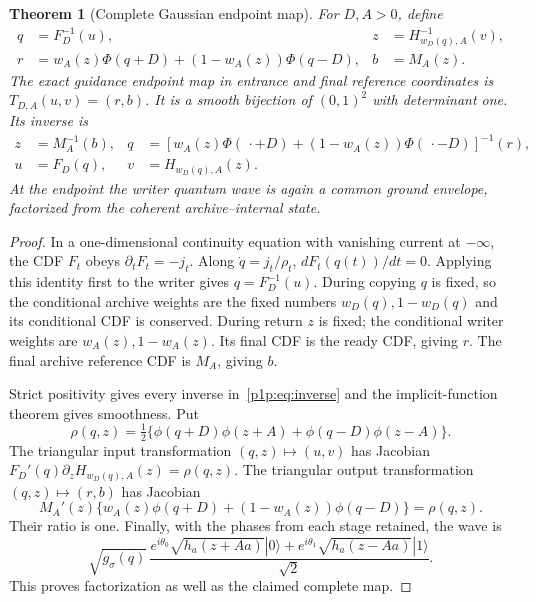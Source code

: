 \documentclass[11pt]{article}
\numberwithin{equation}{section}
\newtheorem{theorem}{Theorem}[section]
\theoremstyle{definition}
\theoremstyle{remark}
\begin{document}
\begin{theorem}[Complete Gaussian endpoint map]\label{p1p:thm:map}
For $D,A>0$, define
\begin{align}
 q&=F_D^{-1}(u),& z&=H_{w_D(q),A}^{-1}(v),\label{p1p:eq:map}\\
 r&=w_A(z)\Phi(q+D)+(1-w_A(z))\Phi(q-D),& b&=M_A(z).\nonumber
\end{align}
The exact guidance endpoint map in entrance and final reference
coordinates is $T_{D,A}(u,v)=(r,b)$. It is a smooth bijection of $(0,1)^2$
with determinant one. Its inverse is
\begin{align}
 z&=M_A^{-1}(b),&
 q&=[w_A(z)\Phi(\,\cdot+D)+(1-w_A(z))\Phi(\,\cdot-D)]^{-1}(r),
 \label{p1p:eq:inverse}\\
 u&=F_D(q),&v&=H_{w_D(q),A}(z).\nonumber
\end{align}
At the endpoint the writer quantum wave is again a common ground
envelope, factorized from the coherent archive--internal state.
\end{theorem}
\begin{proof}
In a one-dimensional continuity equation with vanishing current at
$-\infty$, the CDF $F_t$ obeys
$\partial_tF_t=-j_t$. Along $\dot q=j_t/\rho_t$,
$dF_t(q(t))/dt=0$. Applying this identity first to the writer gives
$q=F_D^{-1}(u)$. During copying $q$ is fixed, so the conditional archive
weights are the fixed numbers $w_D(q),1-w_D(q)$ and its conditional CDF
is conserved. During return $z$ is fixed; the conditional writer weights
are $w_A(z),1-w_A(z)$. Its final CDF is the ready CDF, giving $r$.
The final archive reference CDF is $M_A$, giving $b$.

Strict positivity gives every inverse in~\eqref{p1p:eq:inverse} and the
implicit-function theorem gives smoothness. Put
\[
 \rho(q,z)=\tfrac12\{\phi(q+D)\phi(z+A)+\phi(q-D)\phi(z-A)\}.
\]
The triangular input transformation $(q,z)\mapsto(u,v)$ has Jacobian
$F_D'(q)\partial_zH_{w_D(q),A}(z)=\rho(q,z)$.
The triangular output transformation $(q,z)\mapsto(r,b)$ has Jacobian
\[
 M_A'(z)\{w_A(z)\phi(q+D)+(1-w_A(z))\phi(q-D)\}=\rho(q,z).
\]
Their ratio is one. Finally, with the phases from each stage retained,
the wave is
\[
 \sqrt{g_\sigma(q)}\,
 \frac{e^{i\theta_0}\sqrt{h_a(z+Aa)}|0\rangle+
 e^{i\theta_1}\sqrt{h_a(z-Aa)}|1\rangle}{\sqrt2}.
\]
This proves factorization as well as the claimed complete map.
\end{proof}
\end{document}
